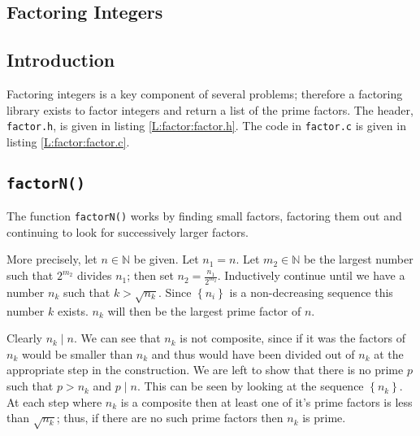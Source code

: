 \documentclass[oneside,12pt]{book}   	%
\newcounter{ex}
\newcounter{pr}
\theoremstyle{definition}
\newcommand{\set}[1]{\left\{#1\right\}}
\begin{document}
\begin{spacing}{1.618}
\appendix
	\chapter{Factoring Integers}\label{C:Factoring}
		\section{Introduction}
		
			Factoring integers is a key component of several problems; therefore a factoring library exists to factor integers and return a list of the prime factors. The header, \texttt{factor.h}, is given in listing \ref{L:factor:factor.h}.  The code in \texttt{factor.c} is given in listing \ref{L:factor:factor.c}. 
		
		\section{\texttt{factorN()}}
		
			The function \texttt{factorN()} works by finding small factors, factoring them out and continuing to look for successively larger factors.
		
			More precisely, let $n\in \mathbb{N}$ be given. Let $n_1=n$. Let $m_2\in\mathbb{N}$ be the largest number such that $2^{m_2}$ divides $n_1$; then set $n_2=\frac{n_1}{2^{m_2}}$. Inductively continue until we have a number $n_k$ such that $k>\sqrt{n_k}$. Since $\set{n_i}$ is a non-decreasing sequence this number $k$ exists. $n_k$ will then be the largest prime factor of $n$. 
			
			Clearly $n_k\mid n$. We can see that $n_k$ is not composite, since if it was the factors of $n_k$ would be smaller than $n_k$ and thus would have been divided out of $n_k$ at the appropriate step in the construction. We are left to show that there is no prime $p$ such that $p>n_k$ and $p\mid n$. This can be seen by looking at the sequence $\set{n_k}$. At each step where $n_k$ is a composite then at least one of it's prime factors is less than $\sqrt{n_k}$; thus, if there are no such prime factors then $n_k$ is prime. 

		

		

	
	
		
	\printindex
\end{spacing}
\end{document}
